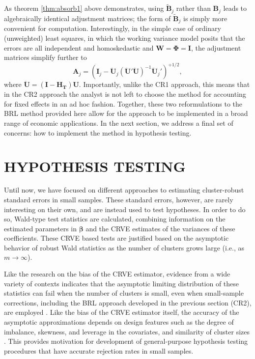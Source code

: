 \documentclass[12pt]{article}
\newcommand{\bm}{\mathbf}
\newcommand{\bs}{\boldsymbol}
\begin{document}
As theorem \ref{thm:absorb1} above demonstrates, using $\bm{\tilde{B}}_j$ rather than $\bm{B}_j$ leads to algebraically identical adjustment matrices; the form of $\bm{\tilde{B}}_j$ is simply more convenient for computation.
Interestingly, in the simple case of ordinary (unweighted) least squares, in which the working variance model posits that the errors are all independent and homoskedastic and $\bm{W} = \bs\Phi = \bm{I}$, the adjustment matrices simplify further to \[
\bm{A}_j = \left(\bm{I}_j - \bm{\ddot{U}}_j\left(\bm{\ddot{U}}'\bm{\ddot{U}}\right)^{-1}\bm{\ddot{U}}_j'\right)^{+1/2},\]
where $\bm{\ddot{U}} = \left(\bm{I} - \bm{H_T}\right)\bm{U}$.
Importantly, unlike the CR1 approach, this means that in the CR2 approach the analyst is not left to choose the method for accounting for fixed effects in an ad hoc fashion.
Together, these two reformulations to the BRL method provided here allow for the approach to be implemented in a broad range of economic applications.
In the next section, we address a final set of concerns: how to implement the method in hypothesis testing. 


\section{HYPOTHESIS TESTING}
\label{sec:testing}

Until now, we have focused on different approaches to estimating cluster-robust standard errors in small samples. 
These standard errors, however, are rarely interesting on their own, and are instead used to test hypotheses.
In order to do so, Wald-type test statistics are calculated, combining information on the estimated parameters in $\bs\beta$ and the CRVE estimates of the variances of these coefficients.
These CRVE based tests are justified based on the asymptotic behavior of robust Wald statistics as the number of clusters grows large (i.e., as $m \to \infty$). 

Like the research on the bias of the CRVE estimator, evidence from a wide variety of contexts indicates that the asymptotic limiting distribution of these statistics can fail when the number of clusters is small, even when small-sample corrections, including the BRL approach developed in the previous section (CR2), are employed \citep{Bell2002bias, Bertrand2004how, Cameron2008bootstrap}. 
Like the bias of the CRVE estimator itself, the accuracy of the asymptotic approximations depends on design features such as the degree of imbalance, skewness, and leverage in the covariates, and similarity of cluster sizes \citep{McCaffrey2001generalizations, Tipton2015small, Webb2013wild}. 
This provides motivation for development of general-purpose hypothesis testing procedures that have accurate rejection rates in small samples.
\end{document}

